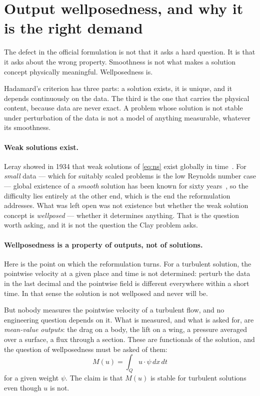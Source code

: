 \documentclass[11pt]{article}
\begin{document}
\section{Output wellposedness, and why it is the right demand}

The defect in the official formulation is not that it asks a hard question. It is that it asks about
the wrong property. Smoothness is not what makes a solution concept physically meaningful.
Wellposedness is.

Hadamard's criterion has three parts: a solution exists, it is unique, and it depends continuously
on the data. The third is the one that carries the physical content, because data are never exact.
A problem whose solution is not stable under perturbation of the data is not a model of anything
measurable, whatever its smoothness.

\paragraph{Weak solutions exist.} Leray showed in 1934 that weak solutions of \eqref{eq:ns} exist
globally in time~\cite{leray}. For \emph{small} data --- which for suitably scaled problems is the
low Reynolds number case --- global existence of a \emph{smooth} solution has been known for sixty
years~\cite{fujitakato,kato}, so the difficulty lies entirely at the other end, which is the end the
reformulation addresses. What was left open was not existence but whether the weak solution
concept is \emph{wellposed} --- whether it determines anything. That is the question worth asking,
and it is not the question the Clay problem asks.

\paragraph{Wellposedness is a property of outputs, not of solutions.} Here is the point on which the
reformulation turns. For a turbulent solution, the pointwise velocity at a given place and time is
not determined: perturb the data in the last decimal and the pointwise field is different
everywhere within a short time. In that sense the solution is not wellposed and never will be.

But nobody measures the pointwise velocity of a turbulent flow, and no engineering question depends
on it. What is measured, and what is asked for, are \emph{mean-value outputs}: the drag on a body,
the lift on a wing, a pressure averaged over a surface, a flux through a section. These are
functionals of the solution, and the question of wellposedness must be asked of them:
\begin{equation}\label{eq:output}
M(u) = \int_Q u\cdot\psi\,dx\,dt
\end{equation}
for a given weight $\psi$. The claim is that $M(u)$ is stable for turbulent solutions even though
$u$ is not.
\end{document}
